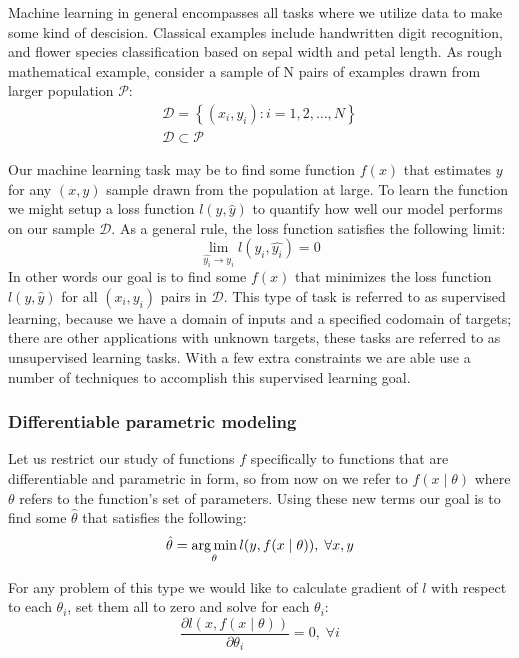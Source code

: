 Machine learning in general encompasses all tasks where we utilize data to
make some kind of descision. Classical examples include handwritten digit
recognition, and flower species classification based on sepal width and petal
length. As rough mathematical example, consider a sample of N pairs of
examples drawn from larger population $\mathcal{P}$:
\begin{gather}
\mathcal{D} = \left\{(x_i, y_i) \colon i = 1,2, \dots, N \right\}\\
\mathcal{D} \subset \mathcal{P}
\end{gather}

Our machine learning task may be to find some function $f(x)$ that estimates
$y$ for any $(x,y)$ sample drawn from the population at large. To learn the
function we might setup a loss function $l(y,\hat{y})$ to quantify how well
our model performs on our sample $\mathcal{D}$. As a general rule, the loss function
satisfies the following limit:
\begin{equation}
\lim\limits_{\hat{y_i}\to y_i} l(y_i, \hat{y_i}) = 0
\end{equation}
In other words our goal is to find some $f(x)$ that minimizes the loss
function $l(y, \hat{y})$ for all $(x_i, y_i)$ pairs in $\mathcal{D}$. This
type of task is referred to as supervised learning, because we have a domain
of inputs and a specified codomain of targets; there are other applications
with unknown targets, these tasks are referred to as unsupervised learning
tasks. With a few extra constraints we are able use a number of techniques to
accomplish this supervised learning goal.

\subsubsection{Differentiable parametric modeling}
Let us restrict our study of functions $f$ specifically to functions that are
differentiable and parametric in form, so from now on we refer to $f(x \mid
\theta)$ where $\theta$ refers to the function's set of parameters. Using these
new terms our goal is to find some $\hat{\theta}$ that satisfies the following:
\begin{equation}
\hat{\theta} = \operatorname*{arg\,min}\limits_\theta l(y, f(x \mid \theta)), \; \forall x, y
\end{equation}

For any problem of this type we would like to calculate gradient of $l$ with
respect to each $\theta_i$, set them all to zero and solve for each $\theta_i$:
\begin{equation}
\frac{\partial l(x, f(x \mid \theta))}{\partial \theta_i} = 0, \; \forall i
\end{equation}

